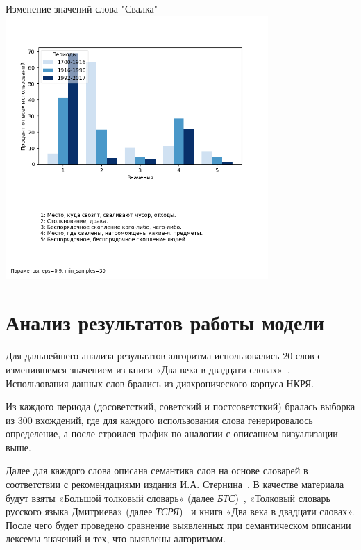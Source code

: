 \documentclass[LI,VKR]{HSEUniversity}
\begin{document}
\begin{FIGURE}[H]{Изменение значений слова "Свалка" \label{fig:example-figure-2}}
	\includegraphics[width=0.75\textwidth]{img/Words_Meanings/Figure_Свалка (Больше значений)}
\end{FIGURE}

%

\chapter{Анализ результатов работы модели}

Для дальнейшего анализа результатов алгоритма использовались 20 слов с изменившемся
значением из книги «Два века в двадцати словах»~\cite{TwoCenturies}.
Использования данных слов брались из диахронического корпуса НКРЯ.

Из каждого периода (досоветсткий, советский и постсоветсткий) бралась выборка из 300 вхождений,
где для каждого использования слова генерировалось определение, а после строился график по аналогии с
описанием визуализации выше.

Далее для каждого слова описана семантика слов на основе словарей в соответствии
с рекомендациями издания И.А. Стернина~\cite{SemanticDefinitionsAndAnalysis}.
В качестве материала будут взяты «Большой толковый словарь» (далее \textit{БТС})~\cite{TolkovyKuznetsov},
«Толковый словарь русского языка Дмитриева» (далее \textit{ТСРЯ})~\cite{TolkovyDmitriev} и
книга «Два века в двадцати словах».
После чего будет проведено сравнение выявленных при семантическом описании лексемы
значений и тех, что выявлены алгоритмом.
\end{document}
